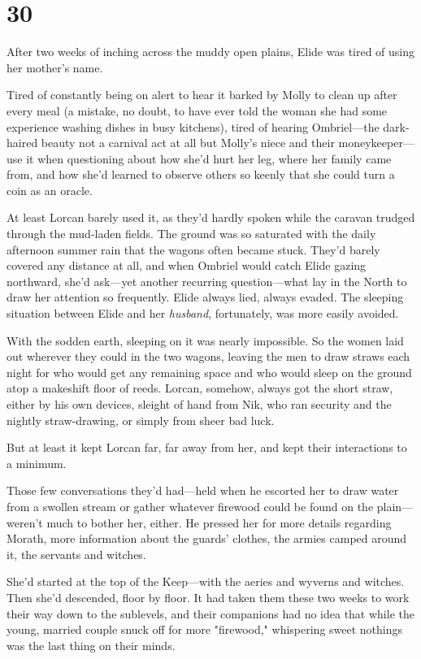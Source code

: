 
\chapter{30}

After two weeks of inching across the muddy open plains, Elide was tired of using her mother's name.

Tired of constantly being on alert to hear it barked by Molly to clean up after every meal (a mistake, no doubt, to have ever told the woman she had some experience washing dishes in busy kitchens), tired of hearing Ombriel---the dark-haired beauty not a carnival act at all but Molly's niece and their moneykeeper---use it when questioning about how she'd hurt her leg, where her family came from, and how she'd learned to observe others so keenly that she could turn a coin as an oracle.

At least Lorcan barely used it, as they'd hardly spoken while the caravan trudged through the mud-laden fields.
The ground was so saturated with the daily afternoon summer rain that the wagons often became stuck.
They'd barely covered any distance at all, and when Ombriel would catch Elide gazing northward, she'd ask---yet another recurring question---what lay in the North to draw her attention so frequently.
Elide always lied, always evaded.
The sleeping situation between Elide and her \emph{husband}, fortunately, was more easily avoided.

With the sodden earth, sleeping on it was nearly impossible.
So the women laid out wherever they could in the two wagons, leaving the men to draw straws each night for who would get any remaining space and who would sleep on the ground atop a makeshift floor of reeds.
Lorcan, somehow, always got the short straw, either by his own devices, sleight of hand from Nik, who ran security and the nightly straw-drawing, or simply from sheer bad luck.

But at least it kept Lorcan far, far away from her, and kept their interactions to a minimum.

Those few conversations they'd had---held when he escorted her to draw water from a swollen stream or gather whatever firewood could be found on the plain---weren't much to bother her, either.
He pressed her for more details regarding Morath, more information about the guards' clothes, the armies camped around it, the servants and witches.

She'd started at the top of the Keep---with the aeries and wyverns and witches.
Then she'd descended, floor by floor.
It had taken them these two weeks to work their way down to the sublevels, and their companions had no idea that while the young, married couple snuck off for more "firewood," whispering sweet nothings was the last thing on their minds.

